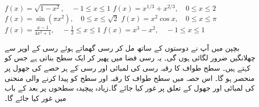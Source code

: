 $f(x)=\sqrt{1-x^2},\quad -1\le x\le 1$
$f(x)=x^{1/3}+x^{2/3},\quad 0\le x\le 2$
$f(x)=\sin(\pi x^2),\quad 0\le x\le \sqrt{2}$
$f(x)=x^2\cos x,\quad 0\le x\le \pi$
$f(x)=\tfrac{x-1}{4x^2+1},\quad -\tfrac{1}{2}\le x\le 1$
$f(x)=x^3-x^2,\quad -1\le x\le 1$

بچپن میں آپ نے دوستوں کے ساتھ مل کر رسی گھماتے ہوئے رسی کے اوپر سے چھلانگیں ضرور لگائی ہوں گی۔ یہ رسی فضا میں پھیر  کر ایک سطح بناتی ہے جس کو  کہتے ہیں۔ سطح طواف کا رقبہ رسی کی لمبائی اور رسی کے ہر حصے کی جھول پر منحصر ہو گا۔ اس حصہ میں سطح طواف کا رقبہ اور سطح کو پیدا کرنے والی منحنی کی لمبائی اور جھول کے تعلق پر غور کیا جائے گا۔زیادہ پیچیدہ سطحوں پر بعد کے باب میں غور کیا جائے گا۔

